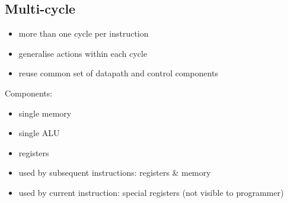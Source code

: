 \documentclass{article}
\begin{document}
\subsection{Multi-cycle}
\begin{itemize}
	\item more than one cycle per instruction
	\item generalise actions within each cycle
	\item reuse common set of datapath and control components
\end{itemize}
Components:
\begin{itemize}
	\item single memory
	\item single ALU
	\item registers
\end{itemize}
\begin{itemize}
	\item used by subsequent instructions: registers \& memory
	\item used by current instruction: special registers (not visible to programmer) 
\end{itemize}
\end{document}
